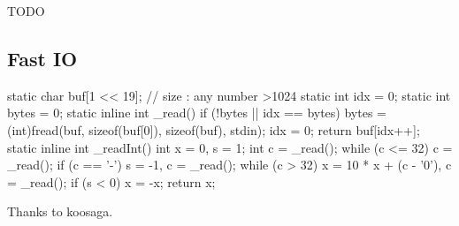 TODO

\subsection{Fast IO}

\begin{cpp}
static char buf[1 << 19]; // size : any number >1024
static int idx = 0;
static int bytes = 0;
static inline int _read() {
  if (!bytes || idx == bytes) {
    bytes = (int)fread(buf, sizeof(buf[0]),
      sizeof(buf), stdin);
    idx = 0;
  }
  return buf[idx++];
}
static inline int _readInt() {
  int x = 0, s = 1;
  int c = _read();
  while (c <= 32) c = _read();
  if (c == '-') s = -1, c = _read();
  while (c > 32) x = 10 * x + (c - '0'), c = _read();
  if (s < 0) x = -x;
  return x;
}
\end{cpp}

Thanks to koosaga.